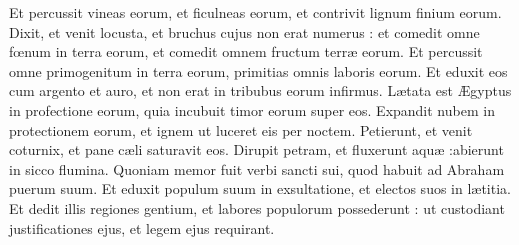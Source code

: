{\VERSE Et percussit vineas eorum,  et ficulneas eorum, et contrivit lignum finium eorum. \EVERSE
\VERSE Dixit,  et venit locusta, et bruchus cujus non erat numerus : \EVERSE
\VERSE et comedit omne fœnum in terra eorum, et comedit omnem fructum terræ eorum. \EVERSE
\VERSE Et percussit omne primogenitum in terra eorum, primitias omnis laboris eorum. \EVERSE
\VERSE Et eduxit eos cum argento et auro, et non erat in tribubus eorum infirmus. \EVERSE
\VERSE Lætata est Ægyptus in profectione eorum, quia incubuit timor eorum super eos. \EVERSE
\VERSE Expandit nubem in protectionem eorum, et ignem ut luceret eis per noctem. \EVERSE
\VERSE Petierunt,  et venit coturnix, et pane cæli saturavit eos. \EVERSE
\VERSE Dirupit petram,  et fluxerunt aquæ :abierunt in sicco flumina. \EVERSE
\VERSE Quoniam memor fuit verbi sancti sui, quod habuit ad Abraham puerum suum. \EVERSE
\VERSE Et eduxit populum suum in exsultatione, et electos suos in lætitia. \EVERSE
\VERSE Et dedit illis regiones gentium, et labores populorum possederunt : \EVERSE
\VERSE ut custodiant justificationes ejus, et legem ejus requirant.

}
